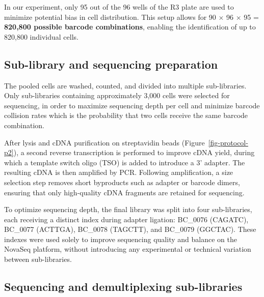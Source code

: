 \documentclass[
  11pt,
  a4paper,
]{report}
\begin{document}
\begin{tcolorbox}[enhanced jigsaw, arc=.35mm, colbacktitle=quarto-callout-warning-color!10!white, rightrule=.15mm, title=\textcolor{quarto-callout-warning-color}{\faExclamationTriangle}\hspace{0.5em}{Warning}, coltitle=black, bottomrule=.15mm, left=2mm, opacityback=0, colback=white, toprule=.15mm, toptitle=1mm, titlerule=0mm, breakable, bottomtitle=1mm, opacitybacktitle=0.6, colframe=quarto-callout-warning-color-frame, leftrule=.75mm]

In our experiment, only 95 out of the 96 wells of the R3 plate are used
to minimize potential bias in cell distribution. This setup allows for
90 × 96 × 95 = \textbf{820,800 possible barcode combinations}, enabling
the identification of up to 820,800 individual cells.

\end{tcolorbox}

\subsection{Sub-library and sequencing
preparation}\label{sub-library-and-sequencing-preparation}

The pooled cells are washed, counted, and divided into multiple
sub-libraries. Only sub-libraries containing approximately 3,000 cells
were selected for sequencing, in order to maximize sequencing depth per
cell and minimize barcode collision rates which is the probability that
two cells receive the same barcode combination.

After lysis and cDNA purification on streptavidin beads
(Figure~\ref{fig-protocol-p2}), a second reverse transcription is
performed to improve cDNA yield, during which a template switch oligo
(TSO) is added to introduce a 3' adapter. The resulting cDNA is then
amplified by PCR. Following amplification, a size selection step removes
short byproducts such as adapter or barcode dimers, ensuring that only
high-quality cDNA fragments are retained for sequencing.

To optimize sequencing depth, the final library was split into four
sub-libraries, each receiving a distinct index during adapter ligation:
BC\_0076 (CAGATC), BC\_0077 (ACTTGA), BC\_0078 (TAGCTT), and BC\_0079
(GGCTAC). These indexes were used solely to improve sequencing quality
and balance on the NovaSeq platform, without introducing any
experimental or technical variation between sub-libraries.

\subsection{Sequencing and demultiplexing
sub-libraries}\label{sequencing-and-demultiplexing-sub-libraries}
\end{document}
